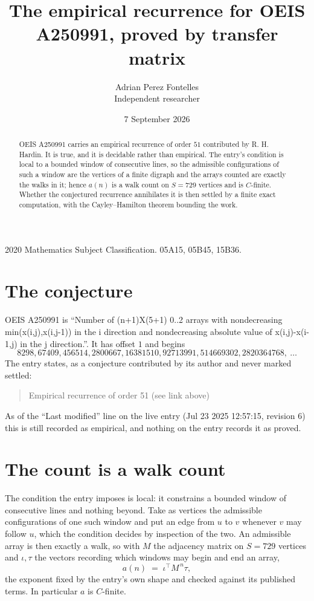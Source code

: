 \documentclass[11pt,a4paper]{article}
\title{The empirical recurrence for OEIS A250991, proved by transfer matrix}
\author{Adrian Perez Fontelles\\ \small Independent researcher}
\date{7 September 2026}
\theoremstyle{plain}
\theoremstyle{definition}
\begin{document}
\maketitle

\begin{abstract}
OEIS A250991 carries an empirical recurrence of order $51$ contributed by R. H. Hardin. It is
true, and it is decidable rather than empirical. The entry's condition is local to a bounded window of consecutive lines, so
the admissible configurations of such a window are the vertices of a finite digraph and the
arrays counted are exactly the walks in it; hence $a(n)$ is a walk count on $S=729$ vertices
and is $C$-finite. Whether the conjectured recurrence annihilates it is then settled by a
finite exact computation, with the Cayley--Hamilton theorem bounding the work.
\end{abstract}

\noindent\small 2020 Mathematics Subject Classification. 05A15, 05B45, 15B36.\normalsize

\section{The conjecture}

OEIS A250991 is ``Number of (n+1)X(5+1) 0..2 arrays with nondecreasing min(x(i,j),x(i,j-1)) in the i direction and nondecreasing absolute value of x(i,j)-x(i-1,j) in the j direction.''. It has offset $1$ and begins
\[
8298, 67409, 456514, 2800667, 16381510, 92713991, 514669302, 2820364768,\ \dots
\]
The entry states, as a conjecture contributed by its author and never marked settled:
\begin{quote}
Empirical recurrence of order 51 (see link above)
\end{quote}
As of the ``Last modified'' line on the live entry (Jul 23 2025 12:57:15, revision 6) this is still
recorded as empirical, and nothing on the entry records it as proved.

\section{The count is a walk count}

The condition the entry imposes is local: it constrains a bounded window of consecutive lines and nothing beyond. Take as
vertices the admissible configurations of one such window and put an edge from $u$ to $v$
whenever $v$ may follow $u$, which the condition decides by inspection of the two. An
admissible array is then exactly a walk, so with $M$ the adjacency matrix on $S=729$ vertices
and $\iota,\tau$ the vectors recording which windows may begin and end an array,
\[
a(n)\;=\;\iota^{\!\top}M^{\,n}\tau ,
\]
the exponent fixed by the entry's own shape and checked against its published terms. In
particular $a$ is $C$-finite.
\end{document}
